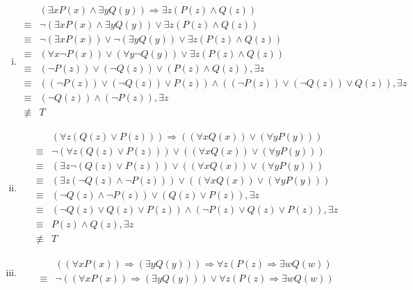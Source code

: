 \documentclass{article}[12pt]
\begin{document}
\begin{enumerate}[(i)]
\item \begin{align*}
&(\exists x P(x) \wedge \exists y Q(y)) \Rightarrow \exists z(P(z) \wedge Q(z))\\
\equiv &\neg (\exists x P(x) \wedge \exists y Q(y)) \vee \exists z(P(z) \wedge Q(z))\\
\equiv &\neg (\exists x P(x))\vee \neg (\exists y Q(y)) \vee \exists z(P(z) \wedge Q(z))\\
\equiv &(\forall x \neg P(x)) \vee (\forall y \neg Q(y))\vee \exists z(P(z) \wedge Q(z))\\
\equiv & (\neg P(z))\vee (\neg Q(z))\vee (P(z)\wedge Q(z)),\exists z\\
\equiv & ((\neg P(z))\vee (\neg Q(z))\vee P(z))\wedge ( (\neg P(z))\vee (\neg Q(z))\vee Q(z)),\exists z\\
\equiv & (\neg Q(z))\wedge (\neg P(z)),\exists z\\
\not\equiv &T
\end{align*}
\item 
\begin{align*}
&(\forall z(Q(z) \vee P(z))) \Rightarrow((\forall x Q(x)) \vee(\forall y P(y)))\\
\equiv & \neg (\forall z(Q(z) \vee P(z)))\vee ((\forall x Q(x)) \vee(\forall y P(y)))\\
\equiv &(\exists z \neg (Q(z) \vee P(z)))\vee ((\forall x Q(x)) \vee(\forall y P(y)))\\
\equiv & (\exists z (\neg Q(z)\wedge \neg P(z)))\vee ((\forall x Q(x)) \vee(\forall y P(y)))\\
\equiv & (\neg Q(z)\wedge \neg P(z))\vee ( Q(z) \vee P(z)),\exists z\\
\equiv &(\neg Q(z)\vee  Q(z) \vee P(z)) \wedge (\neg P(z)\vee  Q(z) \vee P(z)),\exists z\\
\equiv &P(z)\wedge Q(z) ,\exists z\\
\not\equiv &T
\end{align*}
\item 
\begin{align*}
&((\forall x P(x)) \Rightarrow(\exists y Q(y))) \Rightarrow \forall z(P(z) \Rightarrow \exists w Q(w))\\
\equiv & \neg ((\forall x P(x)) \Rightarrow(\exists y Q(y))) \vee \forall z(P(z) \Rightarrow \exists w Q(w))\\

\end{align*}
\end{enumerate}
\end{document}
